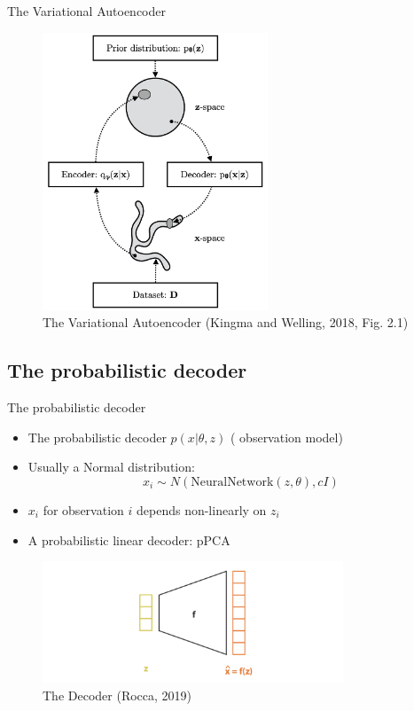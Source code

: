 \documentclass[10pt]{beamer}
\begin{document}
\begin{frame}{The Variational Autoencoder}

\begin{figure}[h]
\centering
\includegraphics[width=0.6\textwidth]{fig/Kingma_Welling_2018_Fig_2_1.png}
\caption{The Variational Autoencoder (Kingma and Welling, 2018, Fig. 2.1)}
\end{figure}

\end{frame}


\subsection{The probabilistic decoder}

\begin{frame}{The probabilistic decoder}
\begin{itemize}
\item The probabilistic decoder $p(x|\theta, z)$ ({\color{uured} observation model})
\item Usually a Normal distribution:
\[
x_i \sim N(\text{NeuralNetwork}(z,\theta), c I)
\]
\item $x_i$ for observation $i$ depends non-linearly on $z_i$
\item A probabilistic linear decoder: {\color{uured} pPCA}
\end{itemize}

\begin{figure}[h]
\centering
\includegraphics[width=0.8\textwidth]{fig/Rocca_VAE_decoder.png}
\caption{The Decoder (Rocca, 2019)}
\end{figure}

\end{frame}
\end{document}
